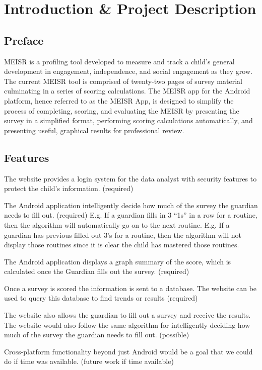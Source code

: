 \chapter{Introduction \& Project Description}
\label{ch:intro}

\section{Preface}
MEISR is a profiling tool developed to measure and track a child’s general development in engagement, independence, and social engagement as they grow. The current MEISR tool is comprised of twenty-two pages of survey material culminating in a series of scoring calculations. The MEISR app for the Android platform, hence referred to as the MEISR App, is designed to simplify the process of completing, scoring, and evaluating the MEISR by presenting the survey in a simplified format, performing scoring calculations automatically, and presenting useful, graphical results for professional review.

\section{Features}
	
The website provides a login system for the data analyst with security features to protect the child’s information. (required)

The Android application intelligently decide how much of the survey the guardian needs to fill out. (required)
E.g. If a guardian fills in 3 “1s” in a row for a routine, then the algorithm will automatically go on to the next routine.
E.g. If a guardian has previous filled out 3’s for a routine, then the algorithm will not display those routines since it is clear the child has mastered those routines.

The Android application displays a graph summary of the score, which is calculated once the Guardian fills out the survey. (required)

Once a survey is scored the information is sent to a database. The website can be used to query this database to find trends or results (required)

The website also allows the guardian to fill out a survey and receive the results. The website would also follow the same algorithm for intelligently deciding how much of the survey the guardian needs to fill out. (possible)

Cross-platform functionality beyond just Android would be a goal that we could do if time was available. (future work if time available)




